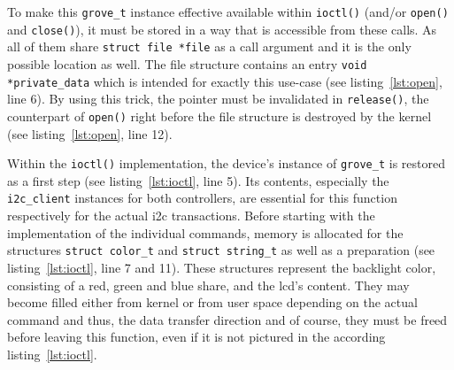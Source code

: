 %
To make this \texttt{grove\_t} instance effective available within \texttt{ioctl()} (and/or \texttt{open()} and \texttt{close()}), it must be stored in a way that is accessible from these calls.
As all of them share \texttt{struct file *file} as a call argument and it is the only possible location as well.
The file structure contains an entry \texttt{void *private_data} which is intended for exactly this use-case (see listing~\ref{lst:open}, line 6). 
By using this trick, the pointer must be invalidated in \texttt{release()}, the counterpart of \texttt{open()} right before the file structure is destroyed by the kernel (see listing~\ref{lst:open}, line 12).

Within the \texttt{ioctl()} implementation, the device's instance of \texttt{grove_t} is restored as a first step (see listing~\ref{lst:ioctl}, line 5).
Its contents, especially the \texttt{i2c_client} instances for both controllers, are essential for this function respectively for the actual \ac{i2c} transactions.
Before starting with the implementation of the individual commands, memory is allocated for the structures \texttt{struct color_t} and \texttt{struct string_t} as well as a preparation (see listing~\ref{lst:ioctl}, line 7 and 11).
These structures represent the backlight color, consisting of a red, green and blue share, and the \ac{lcd}'s content.
They may become filled either from kernel or from user space depending on the actual command and thus, the data transfer direction and of course, they must be freed before leaving this function, even if it is not pictured in the according listing~\ref{lst:ioctl}.

